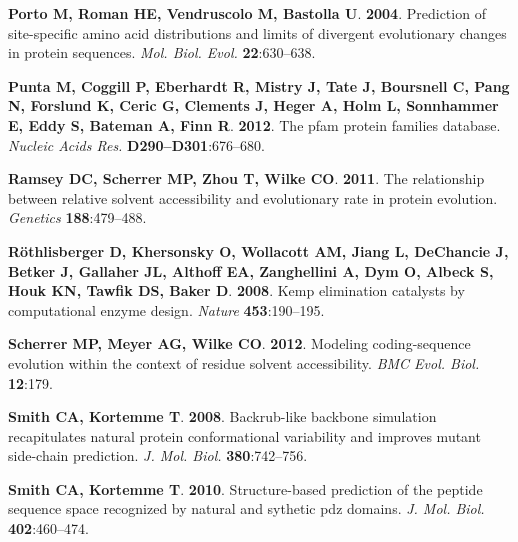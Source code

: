\documentclass[12pt]{article}
\begin{document}
\begin{thebibliography}{36}
\textbf{Porto M, Roman HE, Vendruscolo M, Bastolla U}. \textbf{2004}.
\newblock Prediction of site-specific amino acid distributions and limits of
  divergent evolutionary changes in protein sequences.
\newblock \emph{Mol. Biol. Evol.} \textbf{22}:630--638.

\textbf{Punta M, Coggill P, Eberhardt R, Mistry J, Tate J, Boursnell C, Pang N,
  Forslund K, Ceric G, Clements J, Heger A, Holm L, Sonnhammer E, Eddy S,
  Bateman A, Finn R}. \textbf{2012}.
\newblock The pfam protein families database.
\newblock \emph{Nucleic Acids Res.} \textbf{D290--D301}:676--680.

\textbf{Ramsey DC, Scherrer MP, Zhou T, Wilke CO}. \textbf{2011}.
\newblock The relationship between relative solvent accessibility and
  evolutionary rate in protein evolution.
\newblock \emph{Genetics} \textbf{188}:479--488.

\textbf{R\"o{}thlisberger D, Khersonsky O, Wollacott AM, Jiang L, DeChancie J,
  Betker J, Gallaher JL, Althoff EA, Zanghellini A, Dym O, Albeck S, Houk KN,
  Tawfik DS, Baker D}. \textbf{2008}.
\newblock Kemp elimination catalysts by computational enzyme design.
\newblock \emph{Nature} \textbf{453}:190--195.

\textbf{Scherrer MP, Meyer AG, Wilke CO}. \textbf{2012}.
\newblock Modeling coding-sequence evolution within the context of residue
  solvent accessibility.
\newblock \emph{BMC Evol. Biol.} \textbf{12}:179.

\textbf{Smith CA, Kortemme T}. \textbf{2008}.
\newblock Backrub-like backbone simulation recapitulates natural protein
  conformational variability and improves mutant side-chain prediction.
\newblock \emph{J. Mol. Biol.} \textbf{380}:742--756.

\textbf{Smith CA, Kortemme T}. \textbf{2010}.
\newblock Structure-based prediction of the peptide sequence space recognized
  by natural and sythetic pdz domains.
\newblock \emph{J. Mol. Biol.} \textbf{402}:460--474.


\end{thebibliography}
\end{document}
